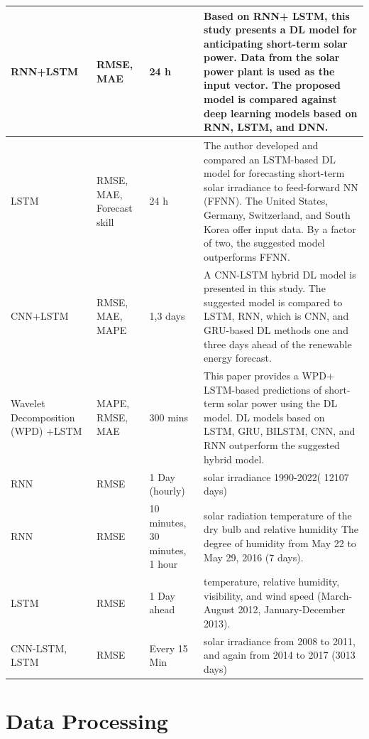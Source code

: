 \documentclass[a4paper,fleqn]{cas-sc}
\begin{document}
\begin{longtable}[c]{|p{}|p{}|p{}|p{}|}
RNN+LSTM\cite{hu2021short} & RMSE, MAE & 24 h &Based on RNN+ LSTM, this study presents a DL model for anticipating short-term solar power. Data from the solar power plant is used as the input vector. The proposed model is compared against deep learning models based on RNN, LSTM, and DNN. \\\hline
LSTM\cite{husein2019day} & RMSE, MAE, Forecast skill & 24 h &The author developed and compared an LSTM-based DL model for forecasting short-term solar irradiance to feed-forward NN (FFNN). The United States, Germany, Switzerland, and South Korea offer input data. By a factor of two, the suggested model outperforms FFNN. \\ \hline
CNN+LSTM\cite{de2019solar} &RMSE, MAE, MAPE & 1,3 days & A CNN-LSTM hybrid DL model is presented in this study. The suggested model is compared to LSTM, RNN, which is CNN, and GRU-based DL methods one and three days ahead of the renewable energy forecast. \\ \hline
Wavelet Decomposition (WPD) +LSTM\cite{li2020hybrid} &MAPE, RMSE, MAE & 300 mins &This paper provides a WPD+ LSTM-based predictions of short-term solar power using the DL model. DL models based on LSTM, GRU, BILSTM, CNN, and RNN outperform the suggested hybrid model. \\ \hline
RNN\cite{cao2005forecast} &RMSE & 1 Day (hourly) & solar irradiance 1990-2022( 12107 days) \\ \hline
RNN\cite{niu2017recurrent} & RMSE & 10 minutes, 30 minutes, 1 hour & solar radiation temperature of the dry bulb and relative humidity The degree of humidity from May 22 to May 29, 2016 (7 days). \\ \hline
LSTM\cite{qing2018hourly} & RMSE & 1 Day ahead &temperature, relative humidity, visibility, and wind speed (March-August 2012, January-December 2013). \\ \hline
CNN-LSTM, LSTM\cite{wang2018wavelet} & RMSE & Every 15 Min & solar irradiance from 2008 to 2011, and again from 2014 to 2017 (3013 days) \\
\hline
\end{longtable}


\section{Data Processing}
\end{document}
